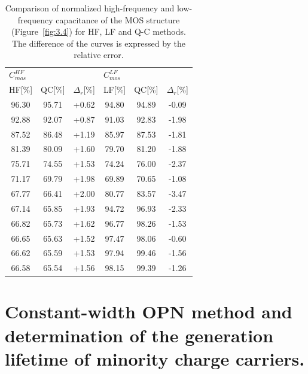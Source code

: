 \begin{table}[h!]\centering
  \begin{tabular}{c c c c c c}
    \multicolumn{3}{l}{$C^{HF}_{mos}$} & \multicolumn{3}{l}{$C^{LF}_{mos}$} \\
    HF[\%] & QC[\%] & $\Delta_r$[\%] & LF[\%] & QC[\%] & $\Delta_r$[\%] \\
    \hline
    96.30 & 95.71 & +0.62 & 94.80 & 94.89 & -0.09 \\
    92.88 & 92.07 & +0.87 & 91.03 & 92.83 & -1.98 \\
    87.52 & 86.48 & +1.19 & 85.97 & 87.53 & -1.81 \\
    81.39 & 80.09 & +1.60 & 79.70 & 81.20 & -1.88 \\
    75.71 & 74.55 & +1.53 & 74.24 & 76.00 & -2.37 \\
    71.17 & 69.79 & +1.98 & 69.89 & 70.65 & -1.08 \\
    67.77 & 66.41 & +2.00 & 80.77 & 83.57 & -3.47 \\
    67.14 & 65.85 & +1.93 & 94.72 & 96.93 & -2.33 \\
    66.82 & 65.73 & +1.62 & 96.77 & 98.26 & -1.53 \\
    66.65 & 65.63 & +1.52 & 97.47 & 98.06 & -0.60 \\
    66.62 & 65.59 & +1.53 & 97.94 & 99.46 & -1.56 \\
    66.58 & 65.54 & +1.56 & 98.15 & 99.39 & -1.26 \\
  \end{tabular}
  \caption[Comparison of normalized frequency and low-frequency
    capacitance of the MOS structure (Figure~\ref{fig:3.4}) for HF, LF
    and Q-C methods]{Comparison of normalized high-frequency and
    low-frequency capacitance of the MOS structure
    (Figure~\ref{fig:3.4}) for HF, LF and Q-C methods. The difference
    of the curves is expressed by the relative error.}\label{tab:3.2}
\end{table}

\section{Constant-width OPN method and determination of the generation lifetime of minority charge carriers.}\label{sec:3.4}

